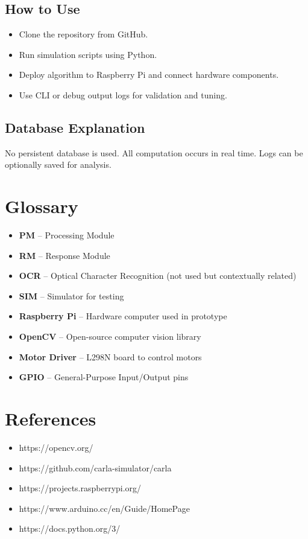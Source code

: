 \documentclass[12pt]{article}
\begin{document}
\subsection{How to Use}
\begin{itemize}
  \item Clone the repository from GitHub.
  \item Run simulation scripts using Python.
  \item Deploy algorithm to Raspberry Pi and connect hardware components.
  \item Use CLI or debug output logs for validation and tuning.
\end{itemize}

\subsection{Database Explanation}
No persistent database is used. All computation occurs in real time. Logs can be optionally saved for analysis.

\section{Glossary}
\begin{itemize}[leftmargin=*]
  \item \textbf{PM} – Processing Module
  \item \textbf{RM} – Response Module
  \item \textbf{OCR} – Optical Character Recognition (not used but contextually related)
  \item \textbf{SIM} – Simulator for testing
  \item \textbf{Raspberry Pi} – Hardware computer used in prototype
  \item \textbf{OpenCV} – Open-source computer vision library
  \item \textbf{Motor Driver} – L298N board to control motors
  \item \textbf{GPIO} – General-Purpose Input/Output pins
\end{itemize}

\section{References}
\begin{itemize}
  \item https://opencv.org/
  \item https://github.com/carla-simulator/carla
  \item https://projects.raspberrypi.org/
  \item https://www.arduino.cc/en/Guide/HomePage
  \item https://docs.python.org/3/
\end{itemize}
\end{document}
